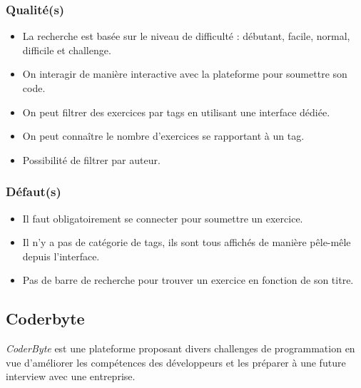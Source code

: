 \subsubsection*{Qualité(s)}

\begin{itemize}
    \item La recherche est basée sur le niveau de difficulté : débutant, facile, normal, difficile et challenge.
    \item On interagir de manière interactive avec la plateforme pour soumettre son code.
    \item On peut filtrer des exercices par \glspl{tag} en utilisant une interface dédiée.
    \item On peut connaître le nombre d'exercices se rapportant à un \gls{tag}.
    \item Possibilité de filtrer par auteur.
\end{itemize}

\subsubsection*{Défaut(s)}

\begin{itemize}
    \item Il faut obligatoirement se connecter pour soumettre un exercice.
    \item Il n'y a pas de catégorie de \glspl{tag}, ils sont tous affichés de manière pêle-mêle depuis l'interface.
    \item Pas de barre de recherche pour trouver un exercice en fonction de son titre.
\end{itemize}

\pagebreak
\subsection*{Coderbyte}

\textit{CoderByte} est une plateforme proposant divers challenges de programmation en vue d'améliorer les compétences des développeurs et les préparer à une future interview avec une entreprise.


